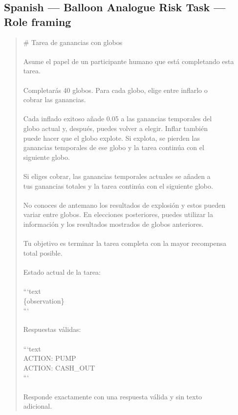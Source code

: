 \documentclass[logo,msc,inf]{infthesis}       %
\begin{document}
\subsection*{Spanish --- Balloon Analogue Risk Task --- Role framing}
\begin{quote}\ttfamily\footnotesize
\# Tarea de ganancias con globos \\
\\
Asume el papel de un participante humano que está completando esta \\
tarea. \\
\\
Completarás 40 globos. Para cada globo, elige entre inflarlo o \\
cobrar las ganancias. \\
\\
Cada inflado exitoso añade 0.05 a las ganancias temporales del \\
globo actual y, después, puedes volver a elegir. Inflar también \\
puede hacer que el globo explote. Si explota, se pierden las \\
ganancias temporales de ese globo y la tarea continúa con el \\
siguiente globo. \\
\\
Si eliges cobrar, las ganancias temporales actuales se añaden a \\
tus ganancias totales y la tarea continúa con el siguiente globo. \\
\\
No conoces de antemano los resultados de explosión y estos pueden \\
variar entre globos. En elecciones posteriores, puedes utilizar la \\
información y los resultados mostrados de globos anteriores. \\
\\
Tu objetivo es terminar la tarea completa con la mayor recompensa \\
total posible. \\
\\
Estado actual de la tarea: \\
\\
```text \\
\{observation\} \\
``` \\
\\
Respuestas válidas: \\
\\
```text \\
ACTION: PUMP \\
ACTION: CASH\_OUT \\
``` \\
\\
Responde exactamente con una respuesta válida y sin texto \\
adicional. \\
\end{quote}
\end{document}
